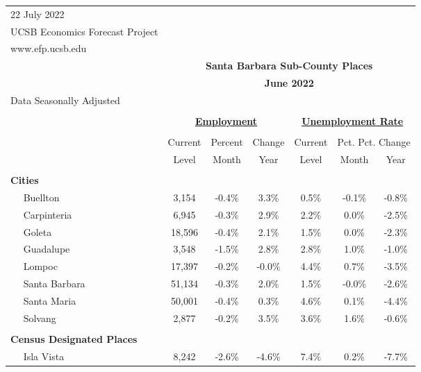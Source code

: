 \documentclass[12pt]{article}
\begin{document}
\begin{landscape}
\begin{table}
\begin{tabular}{|l|c|c|c||c|c|c|}
\multicolumn{1}{l}{\small 22 July 2022} & \multicolumn{6}{c}{} \\
\multicolumn{1}{l}{\small UCSB Economics Forecast Project} & \multicolumn{6}{c}{} \\
\multicolumn{1}{l}{\small www.efp.ucsb.edu} & \multicolumn{6}{c}{} \\
\multicolumn{1}{c}{} & \multicolumn{6}{c}{\large \textbf{Santa Barbara Sub-County Places}} \\
\multicolumn{1}{c}{} & \multicolumn{6}{c}{\large \textbf{June 2022}} \\
\multicolumn{7}{l}{\small Data Seasonally Adjusted} \\ \hline \hline
& \multicolumn{5}{c}{} & \\
& \multicolumn{3}{c}{\textbf{\underline{Employment}} } & \multicolumn{3}{c}{\textbf{\underline{Unemployment Rate}} } \vline \\
& \multicolumn{2}{c}{} & & \multicolumn{2}{c}{} & \\
& Current & \multicolumn{1}{r}{Percent} & Change & Current & \multicolumn{2}{c}{Pct. Pct. Change} \vline \\
& Level & Month & Year & Level & Month & Year \\ \hline
&&&&&& \\
\textbf{Cities} &&&&&& \\
$\quad$ Buellton & 3,154 & -0.4\% & 3.3\% & 0.5\% & -0.1\% & -0.8\% \\
$\quad$ Carpinteria & 6,945 & -0.3\% & 2.9\% & 2.2\% & 0.0\% & -2.5\% \\
$\quad$ Goleta & 18,596 & -0.4\% & 2.1\% & 1.5\% & 0.0\% & -2.3\% \\
$\quad$ Guadalupe & 3,548 & -1.5\% & 2.8\% & 2.8\% & 1.0\% & -1.0\% \\
$\quad$ Lompoc & 17,397 & -0.2\% & -0.0\% & 4.4\% & 0.7\% & -3.5\% \\
$\quad$ Santa Barbara & 51,134 & -0.3\% & 2.0\% & 1.5\% & -0.0\% & -2.6\% \\
$\quad$ Santa Maria & 50,001 & -0.4\% & 0.3\% & 4.6\% & 0.1\% & -4.4\% \\
$\quad$ Solvang & 2,877 & -0.2\% & 3.5\% & 3.6\% & 1.6\% & -0.6\% \\
&&&&&& \\
\textbf{Census Designated Places} &&&&&& \\
$\quad$ Isla Vista & 8,242 & -2.6\% & -4.6\% & 7.4\% & 0.2\% & -7.7\% \\

\end{tabular}
\end{table}
\end{landscape}
\end{document}
